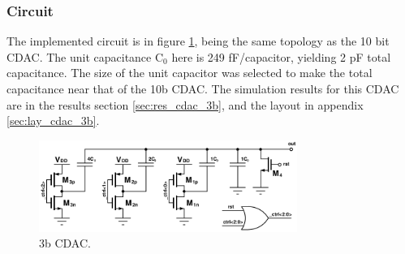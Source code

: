 		\subsubsection{Circuit}
		The implemented circuit is in figure \ref{fig:3b_cdac_cir}, being the same topology as the 10 bit CDAC. The unit capacitance C$_0$ here is 249 fF/capacitor, yielding 2 pF total capacitance. The size of the unit capacitor was selected to make the total capacitance near that of the 10b CDAC. The simulation results for this CDAC are in the results section \ref{sec:res_cdac_3b}, and the layout in appendix \ref{sec:lay_cdac_3b}.
			\begin{figure}[htb!]
			        \centering
			        \includegraphics[width=0.75\textwidth, angle=0]{./figs/design/cdac_3b}
			    \caption{3b CDAC.}
			    \label{fig:3b_cdac_cir}
			\end{figure}

	\FloatBarrier
	\vspace{-1em}
